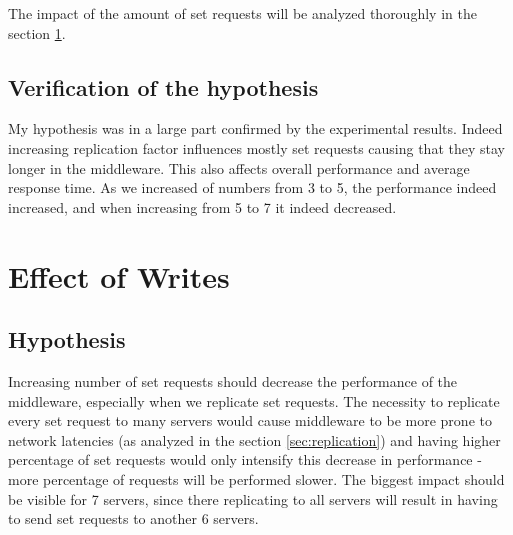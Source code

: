 \documentclass[11pt]{article}
\begin{document}
The impact of the amount of set requests will be analyzed thoroughly in the section \ref{sec:writes}.

\subsection{Verification of the hypothesis}

My hypothesis was in a large part confirmed by the experimental results. Indeed increasing replication factor influences mostly set requests causing that they stay longer in the middleware. This also affects overall performance and average response time. As we increased of numbers from 3 to 5, the performance indeed increased, and when increasing from 5 to 7 it indeed decreased.

\clearpage


\section{Effect of Writes}
\label{sec:writes}

\subsection{Hypothesis}

Increasing number of set requests should decrease the performance of the middleware, especially when we replicate set requests. The necessity to replicate every set request to many servers would cause middleware to be more prone to network latencies (as analyzed in the section \ref{sec:replication}) and having higher percentage of set requests would only intensify this decrease in performance - more percentage of requests will be performed slower. The biggest impact should be visible for 7 servers, since there replicating to all servers will result in having to send set requests to another 6 servers.
\end{document}
